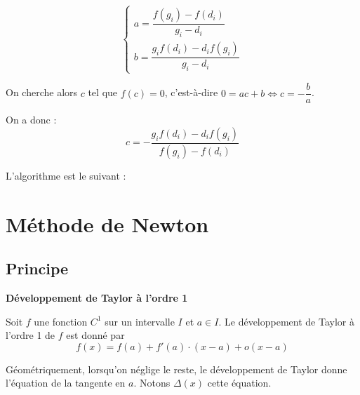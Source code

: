\documentclass[10pt]{article}
\begin{document}
$$
\left\{
\begin{array}{l}
a = \dfrac{f(g_i)  -  f(d_i)  }{g_i-d_i} \\
b = \dfrac{g_i f(d_i) -d_if(g_i) }{g_i  -d_i}
\end{array}
\right.
$$ 

On cherche alors  $c$ tel que $f(c)=0$, c'est-à-dire $0=ac+b \Longleftrightarrow c = -\dfrac{b}{a}$.

On a donc : 
$$
c = -\dfrac{g_i f(d_i) -d_if(g_i) }{f(g_i)  - f(d_i) }
$$

L'algorithme est le suivant :

\begin{pseudo}
\begin{algorithm}[H]
\end{algorithm}
\end{pseudo}


\section{Méthode de Newton}

\subsection{Principe}
\begin{theo}
\textbf{Développement de Taylor à l'ordre 1}

Soit $f$ une fonction $C^1$ sur un intervalle $I$ et $a\in I$. Le développement de Taylor à l'ordre 1 de $f$ est donné par 
$$
f(x)=f(a)+ f'(a)\cdot(x-a)+\mathit{o}(x-a)
$$
\end{theo}

Géométriquement, lorsqu'on néglige le reste, le développement de Taylor donne l'équation de la tangente en $a$. Notons $\Delta(x)$ cette équation.
\end{document}
